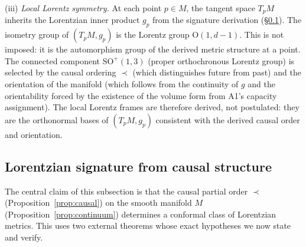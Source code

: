 \documentclass[11pt,a4paper]{article}
\theoremstyle{definition}
\begin{document}
\smallskip\noindent(iii) \textit{Local Lorentz symmetry.}\quad
At each point $p \in M$, the tangent space $T_pM$ inherits the
Lorentzian inner product $g_p$ from the signature derivation
(\S\ref{sec:signature}).  The isometry group of $(T_pM, g_p)$ is the
Lorentz group $\mathrm{O}(1,d{-}1)$.  This is not imposed: it is the
automorphism group of the derived metric structure at a point.
The connected component $\mathrm{SO}^+(1,3)$ (proper orthochronous
Lorentz group) is selected by the causal ordering $\prec$ (which
distinguishes future from past) and the orientation of the manifold
(which follows from the continuity of $g$ and the orientability forced
by the existence of the volume form from A1's capacity assignment).
The local Lorentz frames are therefore derived, not postulated: they
are the orthonormal bases of $(T_pM, g_p)$ consistent with the derived
causal order and orientation.


\subsection{Lorentzian signature from causal structure}
\label{sec:signature}

The central claim of this subsection is that the causal partial order
$\prec$ (Proposition~\ref{prop:causal}) on the smooth manifold $M$
(Proposition~\ref{prop:continuum}) determines a conformal class of
Lorentzian metrics.  This uses two external theorems whose exact
hypotheses we now state and verify.
\end{document}
